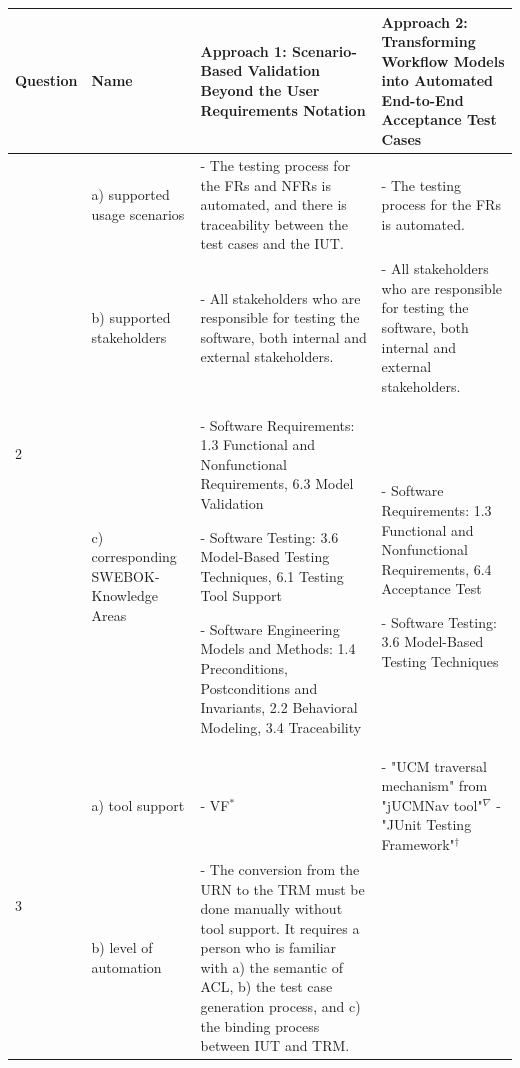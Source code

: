 \newpage
{}
\begin{landscape}
	\begin{table}
		\caption{Synthesis Matrix part 2/2.}
		\begin{longtable}[h]{|p{1.3cm}|>{\raggedright}p{2.6cm}|>{}p{9.2cm}|>{}p{9.2cm}|}
			\hline
			Question 
			& Name 
			& Approach 1: \textbf{Scenario-Based Validation Beyond the User Requirements Notation} 
			& Approach 2: \textbf{Transforming Workflow Models into Automated End-to-End Acceptance Test Cases}\\ \hline
			\multirow{3}{*}{2 \rotatebox[origin=r]{90}{\textbf{Benefits}}} 
			& a) supported usage scenarios 
			& - The testing process for the FRs and NFRs is automated, and there is traceability between the test cases and the IUT. 
			& - The testing process for the FRs is automated. \\ 
			\cline{2-4}
			& b) supported stakeholders 
			& - All stakeholders who are responsible for testing the software, both internal and external stakeholders.
			& - All stakeholders who are responsible for testing the software, both internal and external stakeholders.\\ 
			\cline{2-4}
			& c) corresponding SWEBOK-Knowledge Areas
			& - Software Requirements: 1.3 Functional and Nonfunctional Requirements, 6.3 Model Validation
			
			- Software Testing: 3.6 Model-Based Testing Techniques, 6.1 Testing Tool Support
			
			- Software Engineering Models and Methods: 1.4 Preconditions, Postconditions and Invariants, 2.2 Behavioral Modeling, 3.4 Traceability 
			&
			- Software Requirements: 1.3 Functional and Nonfunctional Requirements, 6.4 Acceptance Test
			
			- Software Testing: 3.6 Model-Based Testing Techniques\\
			\hline %
			\multirow{2}{*}{3 \rotatebox[origin=r]{90}{\textbf{Tools}}} 
			& a) tool support 
			& - VF$^*$
			& 
			- "UCM traversal mechanism" from "jUCMNav tool"$^\nabla$
			- "JUnit Testing Framework"$^\dagger$\\ 
			\cline{2-4}
			& b) level of automation 
			& - The conversion from the URN to the TRM must be done manually without tool support. It requires a person who is familiar with a) the semantic of ACL, b) the test case generation process, and c) the binding process between IUT and TRM.  
			

\end{longtable}
\end{table}
\end{landscape}
